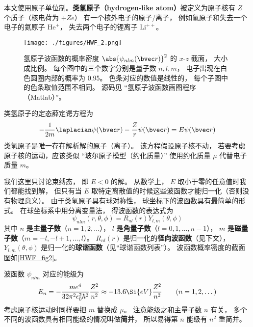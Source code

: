 

本文使用原子单位制。\textbf{类氢原子（hydrogen-like atom）}被定义为原子核有 $Z$ 个质子（核电荷为 $+Ze$） 有一个核外电子的原子/离子， 例如氢原子和失去一个电子的氦原子 $\mathrm{He}^+$， 失去两个电子的锂离子 $\mathrm{Li}^{++}$。 %

\begin{figure}[ht]
\centering
\texttt{[image: ./figures/HWF\_2.png]}
\caption{氢原子波函数的概率密度 $\abs{\psi_{nlm}(\bvec r)}^2$ 的 $x$-$z$ 截面， 大小成比例。 每个图中的三个数字分别是量子数 $n, l, m$， 电子出现在白色圆圈内部的概率为 0.95。 色条对应的数值是线性的， 每个子图中的色条取值范围不相同。 源码见 “氢原子波函数画图程序（Matlab）”。} \label{HWF_fig2}
\end{figure}

类氢原子的定态薛定谔方程为
\begin{equation}\label{HWF_eq1}
-\frac{1}{2m} \laplacian \psi(\bvec r) - \frac{Z}{r} \psi(\bvec r) = E \psi(\bvec r)
\end{equation}
类氢原子是唯一存在解析解的原子（离子）。 该方程假设原子核不动， 若要考虑原子核的运动，应该类似 “玻尔原子模型（约化质量）” 使用约化质量 $\mu$ 代替电子质量 $m$。

我们这里只讨论束缚态， 即 $E < 0$ 的解。  从数学上， $E$ 取小于零的任意值时我们都能找到解， 但只有当 $E$ 取特定离散值的时候这些波函数才能归一化（否则没有物理意义）。 由于类氢原子具有球对称性， 球坐标下的波函数具有最简单的形式。 在球坐标系中用分离变量法， 得波函数的表达式为
\begin{equation}\label{HWF_eq3}
\psi_{nlm} (r,\theta ,\phi) = R_{nl}(r) Y_{l,m}(\theta, \phi)
\end{equation}
其中 $n$ 是\textbf{主量子数}（$n = 1, 2, \dots$）， $l$ 是\textbf{角量子数}（$l = 0, 1, \dots, n - 1$）， $m$ 是\textbf{磁量子数}（$m = -l, -l+1, \dots, l$）。 $R_{nl}(r)$ 是归一化的\textbf{径向波函数}（见下文）， $Y_{l,m}(\theta, \phi)$ 是归一化的\textbf{球谐函数}（见“球谐函数列表”）。 波函数概率密度的截面图如\autoref{HWF_fig2}。

波函数 $\psi_{nlm}$ 对应的能级为
\begin{equation}\label{HWF_eq5}
E_n =  - \frac{m e^4}{32 \pi^2 \epsilon_0^2 \hbar ^2} \frac{Z^2}{n^2} \approx - 13.6\Si{eV} \frac{Z^2}{n^2}
\qquad (n = 1, 2, \dots)
\end{equation}
考虑原子核运动时同样要把 $m$ 替换成 $\mu$。 注意能级之和主量子数 $n$ 有关， 多个不同的波函数具有相同能级的情况叫做\textbf{简并}， 所以易得第 $n$ 能级有 $n^2$ 重简并。

